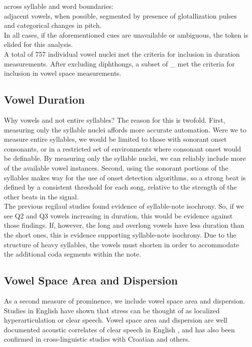 across syllable and word boundaries: \\

adjacent vowels, when possible, segmented by presence of glotallization pulses and categorical changes in pitch. \\

In all cases, if the aforementioned cues are unavailable or ambiguous, the token is elided for this analysis. \\

A total of 757 individual vowel nuclei met the criteria for inclusion in duration measurements. After excluding diphthongs, a subset of _ met the criteria for inclusion in vowel space measurements. 


\subsection{Vowel Duration}
Why vowels and not entire syllables? The reason for this is twofold. First, measuring only the syllable nuclei affords more accurate automation. Were we to measure entire syllables, we would be limited to those with sonorant onset consonants, or in a restricted set of environments where consonant onset would be definable. By measuring only the syllable nuclei, we can reliably include more of the available vowel instances. Second, using the sonorant portions of the syllables makes way for the use of onset detection algorithms, so a strong beat is defined by a consistent threshold for each song, relative to the strength of the other beats in the signal. \\
The previous regilaul studies found evidence of syllable-note isochrony. So, if we see Q2 and Q3 vowels increasing in duration, this would be evidence against those findings. If, however, the long and overlong vowels have less duration than the short ones, this is evidence supporting syllable-note isochrony. Due to the structure of heavy syllables, the vowels must shorten in order to accommodate the additional coda segments within the note. 


\subsection{Vowel Space Area and Dispersion}

As a second measure of prominence, we include vowel space area and dispersion. Studies in English have shown that stress can be thought of as localized hyperarticulation or clear speech. \cite{deJong} Vowel space area and dispersion are well documented acoustic correlates of clear speech in English \cite{bradlow}, and has also been confirmed in cross-linguistic studies with Croatian \cite{rajka} and others. \\

